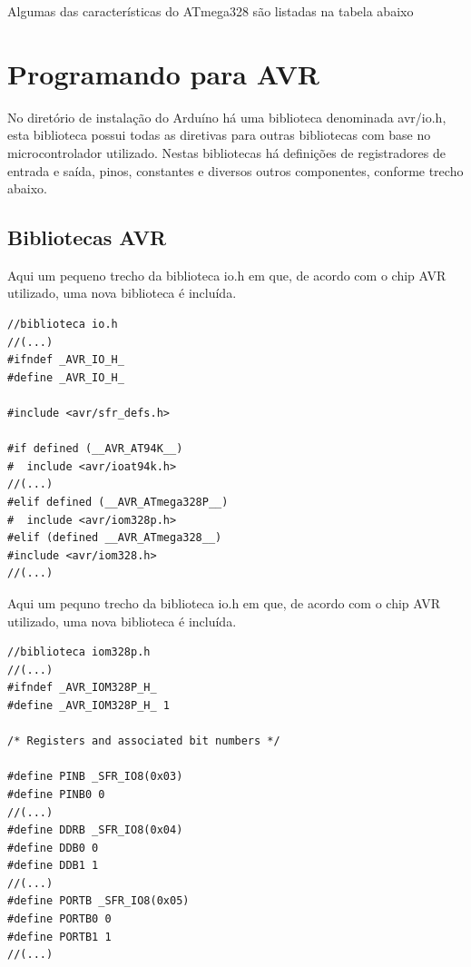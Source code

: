Algumas das características do ATmega328 são listadas na tabela abaixo

\section{Programando para AVR}

No diretório de instalação do Arduíno há uma biblioteca denominada avr/io.h, esta biblioteca possui todas as diretivas para outras bibliotecas com base no microcontrolador utilizado. Nestas bibliotecas há definições de registradores de entrada e saída, pinos, constantes e diversos outros componentes, conforme trecho abaixo.

\subsection{Bibliotecas AVR}

Aqui um pequeno trecho da biblioteca io.h em que, de acordo com o chip AVR utilizado, uma nova biblioteca é incluída.

\begin{lstlisting}
//biblioteca io.h
//(...)
#ifndef _AVR_IO_H_
#define _AVR_IO_H_

#include <avr/sfr_defs.h>

#if defined (__AVR_AT94K__)
#  include <avr/ioat94k.h>
//(...)
#elif defined (__AVR_ATmega328P__)
#  include <avr/iom328p.h>
#elif (defined __AVR_ATmega328__)
#include <avr/iom328.h>
//(...)

\end{lstlisting}

Aqui um pequno trecho da biblioteca io.h em que, de acordo com o chip AVR utilizado, uma nova biblioteca é incluída.

\begin{lstlisting}
//biblioteca iom328p.h
//(...)
#ifndef _AVR_IOM328P_H_
#define _AVR_IOM328P_H_ 1

/* Registers and associated bit numbers */

#define PINB _SFR_IO8(0x03)
#define PINB0 0
//(...)
#define DDRB _SFR_IO8(0x04)
#define DDB0 0
#define DDB1 1
//(...)
#define PORTB _SFR_IO8(0x05)
#define PORTB0 0
#define PORTB1 1
//(...)
\end{lstlisting}
